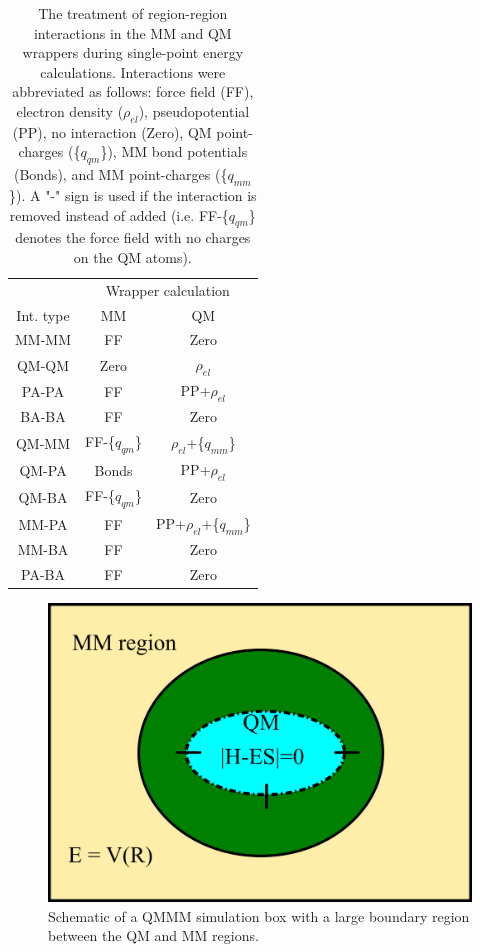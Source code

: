 \documentclass[12pt]{report}
\begin{document}
\begin{table}[hbt]
 \centering
 \begin{tabular}{|c|c c|}
 \hline
  & \multicolumn{2}{|c|}{Wrapper calculation} \\
 Int. type & MM & QM \\ \hline
 MM-MM & FF & Zero \\
 QM-QM & Zero & $\rho_{el}$ \\
 PA-PA & FF & PP+$\rho_{el}$ \\
 BA-BA & FF & Zero \\
 QM-MM & FF-\{$q_{qm}$\} & $\rho_{el}$+\{$q_{mm}$\} \\
 QM-PA & Bonds & PP+$\rho_{el}$ \\
 QM-BA & FF-\{$q_{qm}$\} & Zero \\
 MM-PA & FF & PP+$\rho_{el}$+\{$q_{mm}$\} \\
 MM-BA & FF & Zero \\
 PA-BA & FF & Zero \\ \hline
 \end{tabular}
 \caption{The treatment of region-region interactions in the MM and QM 
 wrappers during single-point energy calculations. Interactions were 
 abbreviated as follows: force field (FF), electron density ($\rho_{el}$),
 pseudopotential (PP), no interaction (Zero), QM point-charges 
 (\{$q_{qm}$\}), MM bond potentials (Bonds), and MM point-charges
 (\{$q_{mm}$\}). A "-" sign is used if the interaction is removed instead of
 added (i.e. FF-\{$q_{qm}$\} denotes the force field with no charges on the
 QM atoms).} 
 \label{tab:IntTable}
\end{table}

\begin{figure}[hbt]
 \centering  
 \includegraphics[scale=0.50]{../doc/images/QMMM_3.png}
 \caption{Schematic of a QMMM simulation box with a large boundary region
 between the QM and MM regions.}
 \label{fig:QMMM3}
\end{figure}
\end{document}
